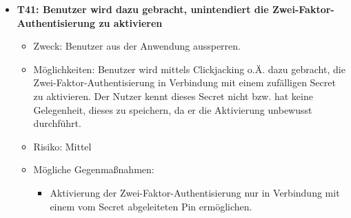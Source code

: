 \documentclass[12pt,DIV14,BCOR10mm,a4paper,parskip=half-,headsepline,headinclude,english,ngerman,bibliography=totocnumbered]{scrreprt}
\begin{document}
\begin{itemize}
  \hypertarget{threat41}{}
  \item \textbf{T41: Benutzer wird dazu gebracht, unintendiert die Zwei-Faktor-Au\-then\-ti\-sier\-ung zu aktivieren}
  \begin{itemize}
    \item Zweck: Benutzer aus der Anwendung aussperren.
    \item Möglichkeiten: Benutzer wird mittels Clickjacking o.Ä. dazu gebracht, die Zwei-Faktor-Authentisierung in Verbindung mit einem zufälligen Secret zu aktivieren. Der Nutzer kennt dieses Secret nicht bzw. hat keine Gelegenheit, dieses zu speichern, da er die Aktivierung unbewusst durchführt.
    \item Risiko: Mittel
    \item Mögliche Gegenmaßnahmen:
      \begin{itemize}
      	\item Aktivierung der Zwei-Faktor-Authentisierung nur in Verbindung mit einem vom Secret abgeleiteten Pin ermöglichen.
      \end{itemize}
  \end{itemize}

\end{itemize}
\end{document}
